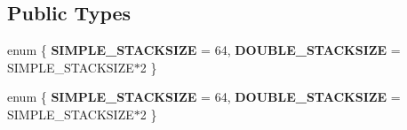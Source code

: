 \subsection*{Public Types}
\begin{DoxyCompactItemize}
\item 
\mbox{\label{structbtDbvt_a701aa081f1dd8a43a6a7890ff66b897b}} 
enum \{ {\bfseries S\+I\+M\+P\+L\+E\+\_\+\+S\+T\+A\+C\+K\+S\+I\+ZE} = 64, 
{\bfseries D\+O\+U\+B\+L\+E\+\_\+\+S\+T\+A\+C\+K\+S\+I\+ZE} = S\+I\+M\+P\+L\+E\+\_\+\+S\+T\+A\+C\+K\+S\+I\+Z\+E$\ast$2
 \}
\item 
\mbox{\label{structbtDbvt_a371539ec119a705ac9c27a818a454ab7}} 
enum \{ {\bfseries S\+I\+M\+P\+L\+E\+\_\+\+S\+T\+A\+C\+K\+S\+I\+ZE} = 64, 
{\bfseries D\+O\+U\+B\+L\+E\+\_\+\+S\+T\+A\+C\+K\+S\+I\+ZE} = S\+I\+M\+P\+L\+E\+\_\+\+S\+T\+A\+C\+K\+S\+I\+Z\+E$\ast$2
 \}
\end{DoxyCompactItemize}
